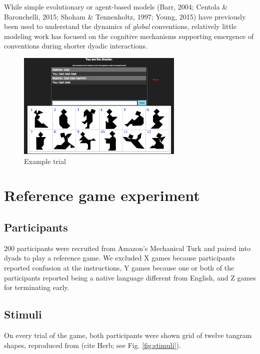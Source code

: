 \documentclass[10pt, letterpaper]{article}
\newenvironment{CodeChunk}{}{}
\begin{document}
While simple evolutionary or agent-based models (Barr, 2004; Centola \&
Baronchelli, 2015; Shoham \& Tennenholtz, 1997; Young, 2015) have
previously been used to understand the dynamics of \emph{global}
conventions, relatively little modeling work has focused on the
cognitive mechanisms supporting emergence of conventions during shorter
dyadic interactions.

\begin{CodeChunk}
\captionsetup{width=0.8\columnwidth}\begin{figure}[H]

{\centering \includegraphics{figs/image-1} 

}

\caption{\label{fig:taskScreenshot} Example trial}\label{fig:image}
\end{figure}
\end{CodeChunk}

\section{Reference game experiment}\label{reference-game-experiment}

\subsection{Participants}\label{participants}

200 participants were recruited from Amazon's Mechanical Turk and paired
into dyads to play a reference game. We excluded X games because
participants reported confusion at the instructions, Y games because one
or both of the participants reported being a native language different
from English, and Z games for terminating early.

\subsection{Stimuli}\label{stimuli}

On every trial of the game, both participants were shown grid of twelve
tangram shapes, reproduced from (cite Herb; see Fig. \ref{fig:stimuli}).
\end{document}
